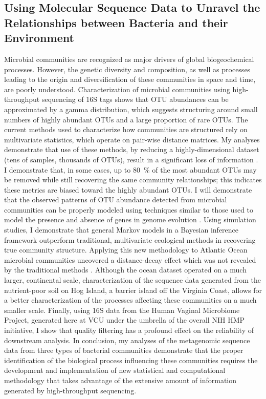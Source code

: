 
\subsection*{Using Molecular Sequence Data to Unravel the Relationships between Bacteria 
and their Environment}

Microbial communities are recognized as major drivers of global biogeochemical processes.  However, 
the genetic diversity and composition, as well as processes leading to the origin and diversification of these 
communities in space and time, are poorly understood.  Characterization of microbial communities using 
high-throughput sequencing of 16S tags shows that OTU abundances can be approximated by a gamma distribution, 
which suggests structuring around small numbers of highly abundant OTUs and a large proportion of rare OTUs.  
The current methods used to characterize how communities are structured rely on multivariate statistics, 
which operate on pair-wise distance matrices.  My analyses demonstrate that use of these methods, by reducing a 
highly-dimensional dataset (tens of samples, thousands of OTUs), result in a significant loss of information 
\citep{Friedline:2012fm}. I demonstrate that, in some cases, up to \SI{80}{\percent} of the most abundant OTUs may be removed while 
still recovering the same community relationships; this indicates these metrics are biased toward the highly abundant OTUs.  I 
will demonstrate that the observed patterns of OTU abundance detected from microbial communities can be properly 
modeled using techniques similar to those used to model the presence and absence of genes in genome 
evolution \citep{Lake:2004cy, Rivera:2004ct}.  Using simulation studies, I demonstrate that general Markov models 
in a Bayesian inference framework outperform traditional, multivariate ecological methods in recovering true community 
structure.  Applying this new methodology to Atlantic Ocean microbial communities uncovered a distance-decay 
effect which was not revealed by the traditional methods \citep{Friedline:2012fm}.  Although the ocean dataset operated on a 
much larger, continental scale, characterization of the sequence data generated from the nutrient-poor soil on Hog Island, 
a barrier island off the Virginia Coast, allows for a better characterization of the processes affecting these communities 
on a much smaller scale.  Finally, using 16S data from the Human Vaginal Microbiome Project, generated here at 
VCU under the umbrella of the overall NIH HMP initiative, I show that 
quality filtering has a profound effect on the reliability of downstream analysis.  In conclusion, 
my analyses of the metagenomic sequence data from three types of bacterial communities demonstrate that the proper 
identification of the biological process influencing these communities requires the development and implementation of 
new statistical and computational methodology that takes advantage of the extensive amount of information generated by 
high-throughput sequencing. 

